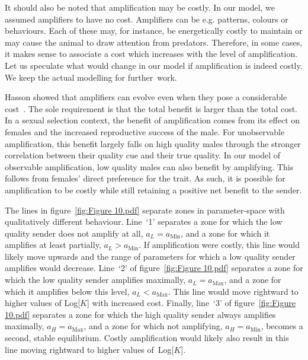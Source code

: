 \documentclass[a4paper,12pt]{article}
\numberwithin{equation}{section}
\numberwithin{figure}{section}
\begin{document}
It should also be noted that amplification may be costly. In our model, we assumed amplifiers to have no cost. Amplifiers can be e.g. patterns, colours or behaviours. Each of these may, for instance, be energetically costly to maintain or may cause the animal to draw attention from predators. Therefore, in some cases, it makes sense to associate a cost which increases with the level of amplification. Let us speculate what would change in our model if amplification is indeed costly. We keep the actual modelling for further~work.

Hasson showed that amplifiers can evolve even when they pose a considerable cost~\cite{Hasson1989}. The sole requirement is that the total benefit is larger than the total cost. In a sexual selection context, the benefit of amplification comes from its effect on females and the increased reproductive success of the male. For unobservable amplification, this benefit largely falls on high quality males through the stronger correlation between their quality cue and their true quality. In our model of observable amplification, low quality males can also benefit by amplifying. This follows from females' direct preference for the trait. As such, it is possible for amplification to be costly while still retaining a positive net benefit to the sender.

The lines in figure~\ref{fig:Figure 10.pdf} separate zones in parameter-space with qualitatively different behaviour. Line~`1' separates a zone for which the low quality sender does not amplify at all, $a_{L}=a_{\text{Min}}$, and a zone for which it amplifies at least partially, $a_{L}>a_{\text{Min}}$. If amplification were costly, this line would likely move upwards and the range of parameters for which a low quality sender amplifies would decrease. Line~`2' of figure~\ref{fig:Figure 10.pdf} separates a zone for which the low quality sender amplifies maximally, $a_{L}=a_{\text{Max}}$, and a zone for which it amplifies below this level, $a_{L}<a_{\text{Max}}$. This line would move rightward to higher values of Log[$K$] with increased cost. Finally, line~`3' of figure~\ref{fig:Figure 10.pdf} separates a zone for which the high quality sender always amplifies maximally, $a_{H}=a_{\text{Max}}$, and a zone for which not amplifying, $a_{H}=a_{\text{Min}}$, becomes a second, stable equilibrium. Costly amplification would likely also result in this line moving rightward to higher values of~Log[$K$].
\end{document}
